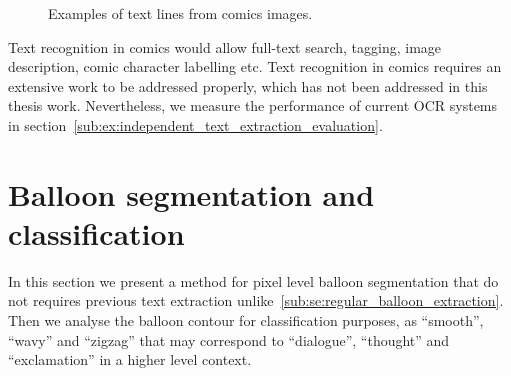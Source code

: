  \begin{figure}[!ht]  %
   \centering
  \caption[Examples of text lines from comics images]{Examples of text lines from comics images.}
  \label{fig:in:texlines_example}
 \end{figure}

Text recognition in comics would allow full-text search, tagging, image description, comic character labelling etc.
Text recognition in comics requires an extensive work to be addressed properly, which has not been addressed in this thesis work.
Nevertheless, we measure the performance of current OCR systems in section~\ref{sub:ex:independent_text_extraction_evaluation}.


\section{Balloon segmentation and classification}
\label{sec:in:balloon}

In this section we present a method for pixel level balloon segmentation that do not requires previous text extraction unlike~\ref{sub:se:regular_balloon_extraction}.
Then we analyse the balloon contour for classification purposes, as ``smooth'', ``wavy'' and ``zigzag'' that may correspond to ``dialogue'', ``thought'' and ``exclamation'' in a higher level context.

